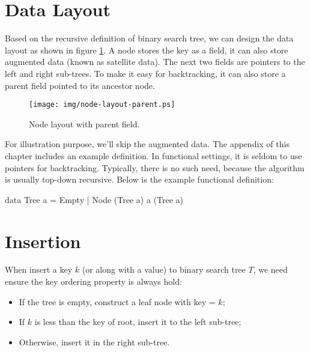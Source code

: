 \documentclass[b5paper]{article}
\begin{document}
\section{Data Layout}

Based on the recursive definition of binary search tree, we can design the data layout as shown in figure \ref{fig:node-layout-parent}. A node stores the key as a field, it can also store augmented data (known as satellite data). The next two fields are pointers to the left and right sub-trees. To make it easy for backtracking, it can also store a parent field pointed to its ancestor node.

\begin{figure}[htbp]
       \begin{center}
        \texttt{[image: img/node-layout-parent.ps]}
        \caption{Node layout with parent field.} \label{fig:node-layout-parent}
       \end{center}
\end{figure}

For illustration purpose, we'll skip the augmented data. The appendix of this chapter includes an example definition. In functional settings, it is seldom to use pointers for backtracking. Typically, there is no such need, because the algorithm is usually top-down recursive. Below is the example functional definition:

\begin{Haskell}
data Tree a = Empty
            | Node (Tree a) a (Tree a)
\end{Haskell}

\section{Insertion}

When insert a key $k$ (or along with a value) to binary search tree $T$, we need ensure the key ordering property is always hold:

\begin{itemize}
\item If the tree is empty, construct a leaf node with key = $k$;
\item If $k$ is less than the key of root, insert it to the left sub-tree;
\item Otherwise, insert it in the right sub-tree.
\end{itemize}
\end{document}
